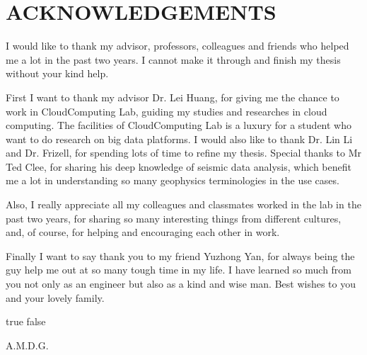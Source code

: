 %
%
%


\chapter*{ACKNOWLEDGEMENTS}

I would like to thank my advisor, professors, colleagues and friends who helped me a lot in the past two years. I cannot make it through and finish my thesis without your kind help.

First I want to thank my advisor Dr. Lei Huang, for giving me the chance to work in CloudComputing Lab, guiding my studies and researches in cloud computing. The facilities of CloudComputing Lab is a luxury for a student who want to do research on big data platforms. I would also like to thank Dr. Lin Li and Dr. Frizell, for spending lots of time to refine my thesis. Special thanks to Mr Ted Clee, for sharing his deep knowledge of seismic data analysis, which benefit me a lot in understanding so many geophysics terminologies in the use cases.

Also, I really appreciate all my colleagues and classmates worked in the lab in the past two years, for sharing so many interesting things from different cultures, and, of course, for helping and encouraging each other in work.

Finally I want to say thank you to my friend Yuzhong Yan, for always being the guy help me out at so many tough time in my life. I have learned so much from you not only as an engineer but also as a kind and wise man. Best wishes to you and your lovely family.

\pagebreak{}

\ifx true false
\vspace*{\fill}
\begin{center}
A.M.D.G.
\end{center}
\vspace*{\fill}
\pagebreak{}
\fi
